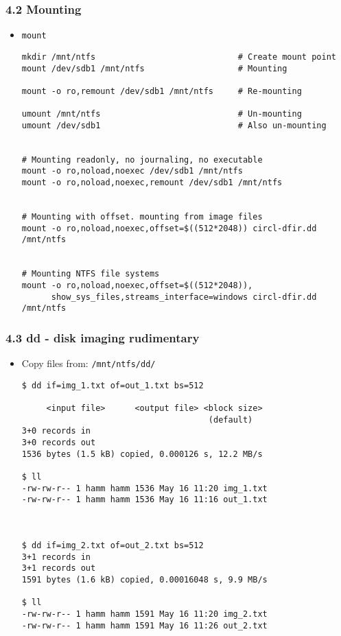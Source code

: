 \begin{frame}[fragile]
  \frametitle{4.2 Mounting}
    \begin{itemize}
        \item \texttt{mount} 
\begin{lstlisting}[basicstyle=\tiny]
mkdir /mnt/ntfs                             # Create mount point
mount /dev/sdb1 /mnt/ntfs                   # Mounting

mount -o ro,remount /dev/sdb1 /mnt/ntfs     # Re-mounting

umount /mnt/ntfs                            # Un-mounting
umount /dev/sdb1                            # Also un-mounting


# Mounting readonly, no journaling, no executable
mount -o ro,noload,noexec /dev/sdb1 /mnt/ntfs
mount -o ro,noload,noexec,remount /dev/sdb1 /mnt/ntfs


# Mounting with offset. mounting from image files
mount -o ro,noload,noexec,offset=$((512*2048)) circl-dfir.dd /mnt/ntfs


# Mounting NTFS file systems
mount -o ro,noload,noexec,offset=$((512*2048)),
      show_sys_files,streams_interface=windows circl-dfir.dd /mnt/ntfs

\end{lstlisting}
    \end{itemize}
\end{frame}


\begin{frame}[fragile]
  \frametitle{4.3 dd - disk imaging rudimentary}
    \begin{itemize}
        \item[] Copy files from: \texttt{/mnt/ntfs/dd/}
\begin{lstlisting}[basicstyle=\tiny]
$ dd if=img_1.txt of=out_1.txt bs=512

     <input file>      <output file> <block size>
                                      (default)
3+0 records in
3+0 records out
1536 bytes (1.5 kB) copied, 0.000126 s, 12.2 MB/s

$ ll
-rw-rw-r-- 1 hamm hamm 1536 May 16 11:20 img_1.txt
-rw-rw-r-- 1 hamm hamm 1536 May 16 11:16 out_1.txt



$ dd if=img_2.txt of=out_2.txt bs=512
3+1 records in
3+1 records out
1591 bytes (1.6 kB) copied, 0.00016048 s, 9.9 MB/s

$ ll
-rw-rw-r-- 1 hamm hamm 1591 May 16 11:20 img_2.txt
-rw-rw-r-- 1 hamm hamm 1591 May 16 11:26 out_2.txt
\end{lstlisting}
    \end{itemize}
\end{frame}


